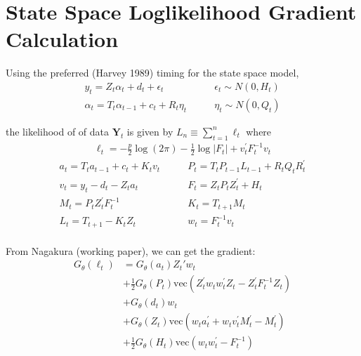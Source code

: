 \documentclass[12pt]{article}
\newcommand{\Gt}{G_\theta}
\newcommand{\vecop}[0]{\text{vec}}
\begin{document}
\section*{State Space Loglikelihood Gradient Calculation}
Using the preferred (Harvey 1989) timing for the state space model,
\begin{align*} 
y_t = Z_t \alpha_t + d_t + \epsilon_t &\qquad \epsilon_t \sim N(0,H_t) \\ 
\alpha_{t} = T_t \alpha_{t-1} + c_t + R_t \eta_t &\qquad \eta_t \sim N(0, Q_t)
\end{align*}

the likelihood of of data $\mathbf{Y}_t$ is given by $L_n \equiv \sum_{t=1}^n \ell_t$ where 
\begin{align*}
\ell_t = -\frac{p}{2} \log(2\pi) - \frac{1}{2} \log|F_t| + v_t^\prime F_t^{-1}v_t
\end{align*}
\begin{align*}
a_t = T_t a_{t-1} + c_t + K_t v_t &\qquad
P_t = T_t P_{t-1}L_{t-1} + R_t Q_t R_t^\prime \\
v_t = y_t - d_t - Z_ta_t &\qquad
F_t = Z_t P_t Z_t^\prime + H_t \\
M_t = P_t Z_t^\prime F_t^{-1} &\qquad
K_t = T_{t+1} M_t \\
L_t = T_{t+1} - K_t Z_t &\qquad
w_t = F_t^{-1} v_t \\
\end{align*} 


From Nagakura (working paper), we can get the gradient:
\begin{align*}
\Gt(\ell_t) &= \Gt(a_t) Z_t' w_t  \\
 &+ \frac{1}{2} \Gt(P_t) \vecop (Z_t^\prime w_t w_t^\prime Z_t - Z_t^\prime F_t^{-1} Z_t) \\
 &+ \Gt(d_t) w_t \\
 &+ \Gt(Z_t) \vecop (w_t a_t^\prime + w_t v_t^\prime M_t^\prime - M_t^\prime) \\
 &+ \frac{1}{2} \Gt(H_t) \vecop (w_t w_t^\prime - F_t^{-1})
\end{align*}
\end{document}
